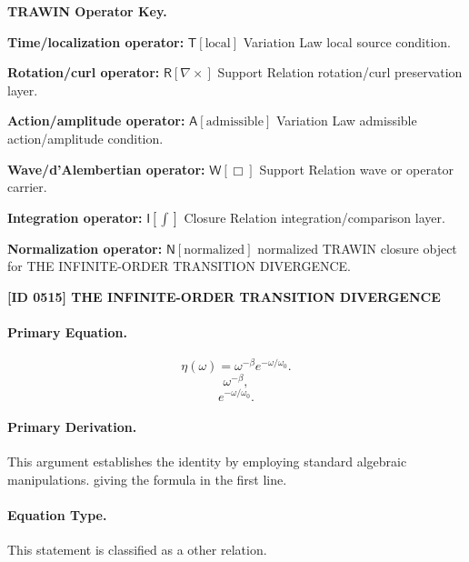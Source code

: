 \par\vspace{0.45\baselineskip}
\noindent\begin{minipage}[t]{\linewidth}
\begingroup
\small
\raggedright
\textbf{TRAWIN Operator Key.}\par
\noindent\textbf{Time/localization operator:} $\mathsf{T}\!\left[\mathrm{local}\right]$ Variation Law local source condition.\par
\noindent\textbf{Rotation/curl operator:} $\mathsf{R}\!\left[\nabla\times\right]$ Support Relation rotation/curl preservation layer.\par
\noindent\textbf{Action/amplitude operator:} $\mathsf{A}\!\left[\mathrm{admissible}\right]$ Variation Law admissible action/amplitude condition.\par
\noindent\textbf{Wave/d'Alembertian operator:} $\mathsf{W}\!\left[\Box\right]$ Support Relation wave or operator carrier.\par
\noindent\textbf{Integration operator:} $\mathsf{I}\!\left[\int\right]$ Closure Relation integration/comparison layer.\par
\noindent\textbf{Normalization operator:} $\mathsf{N}\!\left[\mathrm{normalized}\right]$ normalized TRAWIN closure object for THE INFINITE-ORDER TRANSITION DIVERGENCE.\par
\endgroup
\end{minipage}

\clearpage
\noindent\textbf{[ID 0515] THE INFINITE-ORDER TRANSITION DIVERGENCE}\par
\vspace{0.35em}
\paragraph{Primary Equation.}
\[
\eta(\omega) = \omega^{-\beta} e^{-\omega/\omega_0}.
\]
\[
\omega^{-\beta},
\]
\[
e^{-\omega/\omega_0}.
\]

\paragraph{Primary Derivation.}
This argument establishes the identity by employing standard algebraic manipulations. giving the formula in the first line.
\paragraph{Equation Type.}
This statement is classified as a other relation.

